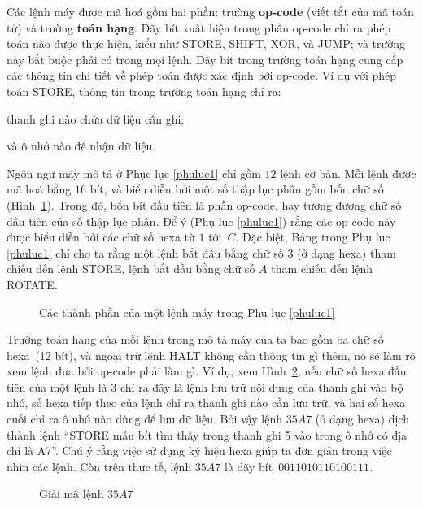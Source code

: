 Các lệnh máy được mã hoá gồm hai phần: trường \textbf{op-code} (viết tắt của mã toán tử)
và trường \textbf{toán hạng}. Dãy bít xuất hiện trong phần op-code chỉ ra phép toán nào
được thực hiện, kiểu như STORE, SHIFT, XOR, và JUMP; và trường này bắt buộc phải có trong
mọi lệnh. Dãy bít trong trường toán hạng cung cấp các thông tin chi tiết về phép toán được
xác định bởi op-code. Ví dụ với phép toán STORE, thông tin trong trường toán hạng chỉ
ra: \begin{inparaenum}[(1)]
\item thanh ghi nào chứa dữ liệu cần ghi;
\item và ô nhớ nào để nhận dữ liệu. 
\end{inparaenum}

Ngôn ngữ máy mô tả ở Phục lục \ref{phuluc1} chỉ gồm $12$ lệnh cơ bản. Mỗi lệnh được mã hoá
bằng $16$ bít, và biểu diễn bởi một số thập lục phân gồm bốn chữ số
(Hình~\ref{fig:fig25}). Trong đó, bốn bít đầu tiên là phần op-code, hay tương đương chữ số
dầu tiên của số thập lục phân. Để ý (Phụ lục \ref{phuluc1}) rằng các op-code này được biểu
diễn bởi các chữ số hexa từ $1$ tới~$C$. Đặc biệt, Bảng trong Phụ lục \ref{phuluc1} chỉ
cho ta rằng một lệnh bắt đầu bằng chữ số $3$ (ở dạng hexa) tham chiếu đến lệnh STORE, lệnh
bắt đầu bằng chữ số $A$ tham chiếu đến lệnh ROTATE.

\begin{figure}[bth] 
  \centering 
  \caption{Các thành phần của một lệnh máy trong Phụ lục \ref{phuluc1}}
  \label{fig:fig25}
\end{figure}


Trường toán hạng của mỗi lệnh trong mô tả máy của ta bao gồm ba chữ số hexa~(12 bít), và
ngoại trừ lệnh HALT không cần thông tin gì thêm, nó sẽ làm rõ xem lệnh đưa bởi op-code
phải làm gì. Ví dụ, xem Hình~\ref{fig:fig26}, nếu chữ số hexa đầu tiên của một lệnh là $3$
chỉ ra đây là lệnh lưu trữ nội dung của thanh ghi vào bộ nhớ, số hexa tiếp theo của lệnh
chỉ ra thanh ghi nào cần lưu trữ, và hai số hexa cuối chỉ ra ô nhớ nào dùng để lưu dữ
liệu. Bởi vậy lệnh $35A7$ (ở dạng hexa) dịch thành lệnh ``STORE mẫu bít tìm thấy trong
thanh ghi 5 vào trong ô nhớ có địa chỉ là A7''. Chú ý rằng việc sử dụng ký hiệu hexa giúp
ta đơn giản trong việc nhìn các lệnh. Còn trên thực tế, lệnh $35A7$ là dãy
bít~$0011010110100111$.
 

\begin{figure}[thb]
  \centering 
  \caption{Giải mã lệnh $35A7$}
  \label{fig:fig26}
\end{figure}

